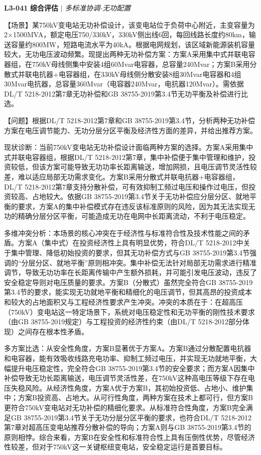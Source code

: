\documentclass[11pt,a4paper]{ctexart}
\begin{document}
\noindent\textbf{L3-041} \hfill \textbf{综合评估} $|$ \textit{多标准协调-无功配置}
\begin{description}[leftmargin=1.5em,style=nextline,font=\normalfont]
  \item[Q:] 【场景】某750kV变电站无功补偿设计，该变电站位于负荷中心附近，主变容量为2×1500MVA，额定电压750/330kV，330kV侧出线6回，每回线路长度约80km，输送容量约800MW，短路电流水平为40kA。根据电网规划，该区域新能源装机容量较大，无功电压波动频繁。现提出两种无功补偿方案：方案A采用集中式并联电容器组，在750kV母线侧集中安装4组60Mvar电容器，总容量240Mvar；方案B采用分散式并联电抗器+电容器组，在330kV母线侧分散安装8组30Mvar电容器和4组30Mvar电抗器，总容量360Mvar（电容器240Mvar，电抗器120Mvar）。需依据DL/T 5218-2012第7章无功补偿和GB 38755-2019第3.4节无功平衡及补偿进行比选。

【问题】根据DL/T 5218-2012第7章和GB 38755-2019第3.4节，分析两种无功补偿方案在电压调节能力、无功分层分区平衡及经济性方面的差异，并给出推荐方案。
  \item[A:] 现状诊断：当前750kV变电站无功补偿设计面临两种方案的选择。方案A采用集中式并联电容器组，根据DL/T 5218-2012第7章，集中补偿便于集中管理和维护，投资较低，但该方案可能导致无功功率长距离输送，增加网损，且电压调节灵活性较差，难以适应局部无功需求变化。方案B采用分散式并联电抗器+电容器组，DL/T 5218-2012第7章支持分散补偿，可有效抑制工频过电压和操作过电压，但投资较高、占地较大。依据GB 38755-2019第3.4节关于无功补偿应分层分区、就地平衡的要求，方案A的集中补偿模式存在违反该标准原则的风险，因为其无法实现无功的精确分层分区平衡，可能造成无功在电网中长距离流动，不利于电压稳定。

多维冲突分析：本场景的核心冲突在于经济性与标准符合性及技术性能之间的矛盾。方案A（集中式）在投资经济性上具有明显优势，符合DL/T 5218-2012中关于集中管理、降低初始投资的要求，但其无功补偿方式与GB 38755-2019第3.4节强调的“分层分区、就地平衡”原则相冲突。集中补偿无法针对局部无功需求进行精准调节，导致无功功率在长距离传输中产生额外损耗，并可能引发电压波动，违反了安全稳定导则对电压质量的要求。方案B（分散式）虽然完全符合GB 38755-2019第3.4节的要求，能实现无功就地平衡和精细化的电压调节，但其高昂的投资成本和较大的占地面积又与工程经济性要求产生冲突。冲突的本质在于：在超高压（750kV）变电站这一特定场景下，系统对电压稳定性和无功平衡的刚性技术要求（由GB 38755-2019规定）与工程投资的经济性约束（由DL/T 5218-2012部分体现）之间存在根本性矛盾。

多方案比选：从安全性角度，方案B显著优于方案A。方案B通过分散配置电抗器和电容器，能有效吸收线路充电功率、抑制工频过电压，并实现无功就地平衡，大幅提升电压稳定性，完全符合GB 38755-2019第3.4节的安全要求；而方案A因集中补偿导致无功长距离输送，电压调节灵活性差，在750kV这种高电压等级下存在电压失稳风险。从经济性角度，方案A优于方案B，其初始投资低、占地小、维护集中；方案B投资高、占地大。从可行性角度，两种方案在技术上都可行，但方案B更符合750kV变电站对无功补偿的精细化要求。从标准符合性角度，方案B完全满足GB 38755-2019第3.4节关于无功分层分区平衡的要求，也符合DL/T 5218-2012第7章对超高压变电站推荐分散补偿的导向；方案A则与GB 38755-2019第3.4节的原则相悖。综合来看，方案B在安全性和标准符合性上具有压倒性优势，尽管经济性较差，但对于750kV这一关键枢纽变电站，安全稳定运行是首要目标。


\end{description}
\end{document}
